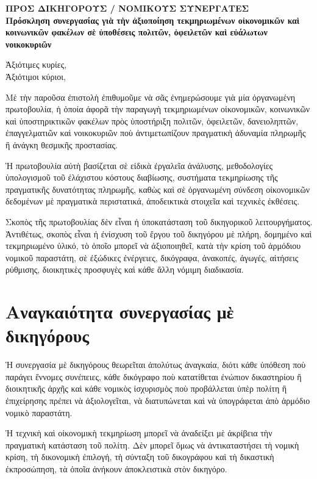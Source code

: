 \documentclass[12pt,a4paper]{article}
\begin{document}
	
\begin{center} 
	{\Large \textbf{ΠΡΟΣ ΔΙΚΗΓΟΡΟΥΣ / ΝΟΜΙΚΟΥΣ ΣΥΝΕΡΓΑΤΕΣ}}\\[0.5em] 
	{\large \textbf{Πρόσκληση συνεργασίας γιὰ τὴν ἀξιοποίηση τεκμηριωμένων οἰκονομικῶν καὶ κοινωνικῶν φακέλων σὲ ὑποθέσεις πολιτῶν, ὀφειλετῶν καὶ εὐάλωτων νοικοκυριῶν}} 
\end{center} 

\vspace{1em} 

Ἀξιότιμες κυρίες,\\ 
Ἀξιότιμοι κύριοι, 

Μὲ τὴν παροῦσα ἐπιστολὴ ἐπιθυμοῦμε νὰ σᾶς ἐνημερώσουμε γιὰ μία ὀργανωμένη πρωτοβουλία, ἡ ὁποία ἀφορᾶ τὴν παραγωγὴ τεκμηριωμένων οἰκονομικῶν, κοινωνικῶν καὶ ὑποστηρικτικῶν φακέλων πρὸς ὑποστήριξη πολιτῶν, ὀφειλετῶν, δανειοληπτῶν, ἐπαγγελματιῶν καὶ νοικοκυριῶν ποὺ ἀντιμετωπίζουν πραγματικὴ ἀδυναμία πληρωμῆς ἢ ἀνάγκη θεσμικῆς προστασίας. 

Ἡ πρωτοβουλία αὐτὴ βασίζεται σὲ εἰδικὰ ἐργαλεῖα ἀνάλυσης, μεθοδολογίες ὑπολογισμοῦ τοῦ ἐλάχιστου κόστους διαβίωσης, συστήματα τεκμηρίωσης τῆς πραγματικῆς δυνατότητας πληρωμῆς, καθὼς καὶ σὲ ὀργανωμένη σύνδεση οἰκονομικῶν δεδομένων μὲ πραγματικὰ περιστατικά, ἀποδεικτικὰ στοιχεῖα καὶ τεχνικὲς ἐκθέσεις. 

Σκοπὸς τῆς πρωτοβουλίας δὲν εἶναι ἡ ὑποκατάσταση τοῦ δικηγορικοῦ λειτουργήματος. Ἀντιθέτως, σκοπὸς εἶναι ἡ ἐνίσχυση τοῦ ἔργου τοῦ δικηγόρου μὲ πλήρη, δομημένο καὶ τεκμηριωμένο ὑλικό, τὸ ὁποῖο μπορεῖ νὰ ἀξιοποιηθεῖ, κατὰ τὴν κρίση τοῦ ἁρμόδιου νομικοῦ παραστάτη, σὲ ἐξώδικες ἐνέργειες, δικόγραφα, ἀνακοπές, ἀγωγές, αἰτήσεις ρύθμισης, διοικητικὲς προσφυγὲς καὶ κάθε ἄλλη νόμιμη διαδικασία. 

\section{Αναγκαιότητα συνεργασίας μὲ δικηγόρους} 

Ἡ συνεργασία μὲ δικηγόρους θεωρεῖται ἀπολύτως ἀναγκαία, διότι κάθε ὑπόθεση ποὺ παράγει ἔννομες συνέπειες, κάθε δικόγραφο ποὺ κατατίθεται ἐνώπιον δικαστηρίου ἢ διοικητικῆς ἀρχῆς καὶ κάθε νομικὸς ἰσχυρισμὸς ποὺ προβάλλεται ὑπὲρ πολίτη ἢ ἐπιχείρησης πρέπει νὰ ἀξιολογεῖται, νὰ διατυπώνεται καὶ νὰ ὑπογράφεται ἀπὸ ἁρμόδιο νομικὸ παραστάτη. 

Ἡ τεχνικὴ καὶ οἰκονομικὴ τεκμηρίωση μπορεῖ νὰ ἀναδείξει μὲ ἀκρίβεια τὴν πραγματικὴ κατάσταση τοῦ πολίτη. Δὲν μπορεῖ ὅμως νὰ ἀντικαταστήσει τὴ νομικὴ κρίση, τὴ δικονομικὴ ἐπιλογή, τὴ σύνταξη τοῦ δικογράφου καὶ τὴ δικαστικὴ ἐκπροσώπηση, τὰ ὁποῖα ἀνήκουν ἀποκλειστικὰ στὸν δικηγόρο. 
\end{document}
